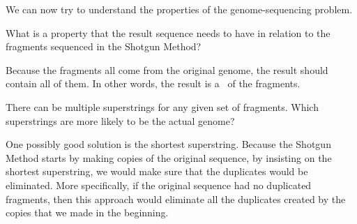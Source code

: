 \begin{cluster}
\label{grp:grm:genome::genome-sequencing-as-a-string-problem}

\begin{gram}
\label{grm:genome::genome-sequencing-as-a-string-problem}
We can now try to understand the properties of the genome-sequencing
problem.

\end{gram}
\end{cluster}

\begin{flex}
\label{grp:xrcs:genome::properties-of-the-solution}

\begin{exercise}
\label{xrcs:genome::properties-of-the-solution}
What is a property that the result sequence needs to have in relation
to the fragments sequenced in the Shotgun Method?

\end{exercise}

\begin{solution}
\label{sol:genome::fragments}
Because the fragments all come from the original genome, the result
should contain all of them.  In other words, the result is
a~ of the fragments.

\end{solution}
\end{flex}

\begin{flex}
\label{grp:xrcs:genome::multiple}

\begin{exercise}
\label{xrcs:genome::multiple}
There can be multiple superstrings for any given set of fragments.
Which superstrings are more likely to be the actual genome?

\end{exercise}

\begin{solution}
\label{sol:genome::possibly}
One possibly good solution is the shortest superstring. 
Because the Shotgun Method starts by making copies of the original
sequence, by insisting on the shortest superstring, we would make sure
that the duplicates would be eliminated.
More specifically, if the original sequence had no duplicated
fragments, then this approach would eliminate all the duplicates
created by the copies that we made in the beginning.

\end{solution}
\end{flex}

